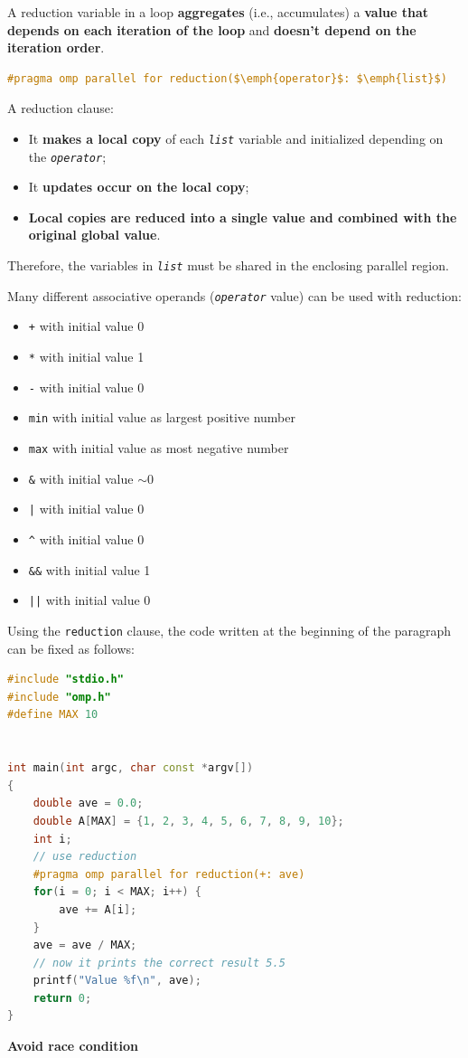 \highspace
A reduction variable in a loop \textbf{aggregates} (i.e., accumulates) a \textbf{value that depends on each iteration of the loop} and \textbf{doesn't depend on the iteration order}.

\begin{openmpbox}
    \begin{lstlisting}[language=C++, mathescape=true]
#pragma omp parallel for reduction($\emph{operator}$: $\emph{list}$)\end{lstlisting}
\end{openmpbox}

\noindent
A reduction clause:
\begin{itemize}
    \item It \textbf{makes a local copy} of each \texttt{\emph{list}} variable and initialized depending on the \texttt{\emph{operator}};
    \item It \textbf{updates occur on the local copy};
    \item \textbf{Local copies are reduced into a single value and combined with the original global value}.
\end{itemize}
Therefore, the variables in \texttt{\emph{list}} must be shared in the enclosing parallel region.

\highspace
Many different associative operands (\texttt{\emph{operator}} value) can be used with reduction:
\begin{itemize}
    \item \texttt{+} with initial value 0
    \item \texttt{*} with initial value 1
    \item \texttt{-} with initial value 0
    \item \texttt{min} with initial value as largest positive number
    \item \texttt{max} with initial value as most negative number
    \item \texttt{\&} with initial value $\sim0$
    \item \texttt{|} with initial value 0
    \item \texttt{\textasciicircum} with initial value 0
    \item \texttt{\&\&} with initial value 1
    \item \texttt{||} with initial value 0
\end{itemize}
Using the \texttt{reduction} clause, the code written at the beginning of the paragraph can be fixed as follows:
\begin{center}
\begin{lstlisting}[language=C++]
#include "stdio.h"
#include "omp.h"
#define MAX 10


int main(int argc, char const *argv[])
{
    double ave = 0.0;
    double A[MAX] = {1, 2, 3, 4, 5, 6, 7, 8, 9, 10};
    int i;
    // use reduction
    #pragma omp parallel for reduction(+: ave)
    for(i = 0; i < MAX; i++) {
        ave += A[i];
    }
    ave = ave / MAX;
    // now it prints the correct result 5.5
    printf("Value %f\n", ave);
    return 0;
}
\end{lstlisting}
\textcolor{Green3}{ \textbf{Avoid race condition}}
\end{center}
